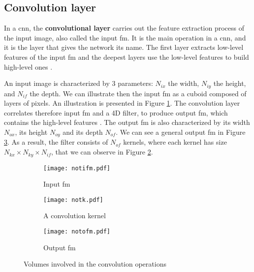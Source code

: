 \subsection{Convolution layer} \label{subs:2dconv}
In a \acrshort{cnn}, the \textbf{convolutional layer} carries out the feature extraction process of the input image, also called the input \acrfull{fm}. It is the main operation in a \acrshort{cnn}, and it is the layer that gives the network its name. The first layer extracts low-level features of the input \acrshort{fm} and the deepest layers use the low-level features to build high-level ones \cite{goodfellow_deep_2016}.

An input image is characterized by 3 parameters: \textbf{$N_{ix}$} the width, \textbf{$N_{iy}$} the height, and \textbf{$N_{if}$} the depth. We can illustrate then the input \acrshort{fm} as a cuboid composed of layers of pixels. An illustration is presented in Figure \ref{fig:notation:ifm}.
The convolution layer correlates therefore input \acrshort{fm} and a 4D filter, to produce output \acrshort{fm}, which contains the high-level features \cite{zhao_towards_2018}. The output \acrshort{fm} is also characterized by its width $N_{ox}$, its height $N_{oy}$ and its depth $N_{of}$. We can see a general output \acrshort{fm} in Figure \ref{fig:notation:ofm}. As a result, the filter consists of $N_{of}$ kernels, where each kernel has size $N_{kx} \times N_{ky} \times N_{if}$, that we can observe in Figure \ref{fig:notation:k}.
%
\begin{figure}
    \centering
    \begin{subfigure}{.32\textwidth}
    \centering
    \texttt{[image: notifm.pdf]}
    \caption{Input \acrshort{fm}}
    \label{fig:notation:ifm}
    \end{subfigure}
    \begin{subfigure}{.32\textwidth}
    \centering
    \texttt{[image: notk.pdf]}
    \caption{A convolution kernel}
    \label{fig:notation:k}
    \end{subfigure}
    \begin{subfigure}{.32\textwidth}
    \centering
    \texttt{[image: notofm.pdf]}
    \caption{Output \acrshort{fm}}
    \label{fig:notation:ofm}
    \end{subfigure}
    \caption{Volumes involved in the convolution operations}
    \label{fig:notconv}
\end{figure}

